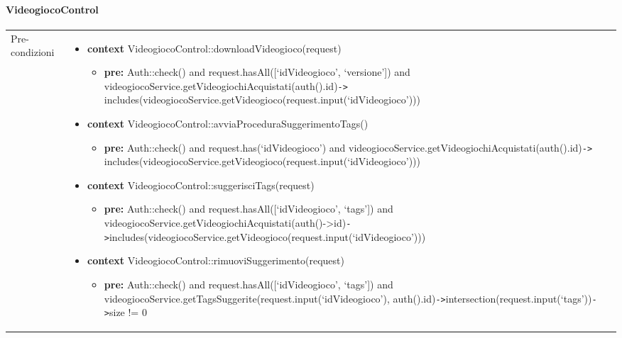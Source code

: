 \newpage
\paragraph{VideogiocoControl}
\small\begin{tabular}{|| l | p{28.5em} ||} 
\hline
Pre-condizioni & \begin{itemize}[leftmargin=*]
	\item \textbf{context} VideogiocoControl::downloadVideogioco(request)
	\begin{itemize}
		\item[ ] \textbf{pre:} Auth::check()
		and request.hasAll([‘idVideogioco’, ‘versione’])
		and videogiocoService.getVideogiochiAcquistati(auth().id)\verb|->| includes(videogiocoService\newline .getVideogioco(request.input(‘idVideogioco’)))	
	\end{itemize}

	\item \textbf{context} VideogiocoControl::avviaProceduraSuggerimentoTags()
	\begin{itemize}
		\item[ ] \textbf{pre:} Auth::check()
		and request.has(‘idVideogioco’)
		and videogiocoService.getVideogiochiAcquistati(auth().id)\verb|->| includes(videogiocoService\newline .getVideogioco(request.input(‘idVideogioco’)))
	\end{itemize}

	\item \textbf{context} VideogiocoControl::suggerisciTags(request)
	\begin{itemize}
		\item[ ] \textbf{pre:} Auth::check()
		and request.hasAll([‘idVideogioco’, ‘tags’])
		and videogiocoService.getVideogiochiAcquistati(auth()->id)\verb|->|includes(videogiocoService\newline .getVideogioco(request.input(‘idVideogioco’)))
	\end{itemize}

	\item \textbf{context} VideogiocoControl::rimuoviSuggerimento(request)
	\begin{itemize}
		\item[ ] \textbf{pre:} Auth::check()
		and request.hasAll([‘idVideogioco’, ‘tags’])
		and videogiocoService.getTagsSuggerite(request.input(‘idVideogioco’), auth().id)\verb|->|intersection(request.input(‘tags’))\verb|->|size != 0	
	\end{itemize}


\end{itemize}
\end{tabular}
